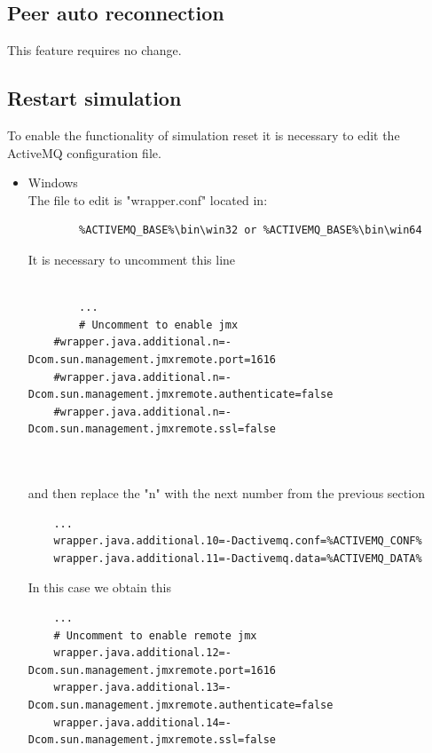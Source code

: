 \documentclass{article}
\begin{document}
\subsection{ Peer auto reconnection}
This feature requires no change.

\subsection{Restart simulation}

To enable the functionality of simulation reset it is necessary to edit the ActiveMQ configuration file.

\begin{itemize}
	\item Windows\\ 
The file to edit is "wrapper.conf" located in:

\lstset{language=Java}
\begin{lstlisting}	
		%ACTIVEMQ_BASE%\bin\win32 or %ACTIVEMQ_BASE%\bin\win64
\end{lstlisting}
It is necessary to uncomment this line

\begin{lstlisting}
  	
    	...
    	# Uncomment to enable jmx
	#wrapper.java.additional.n=-Dcom.sun.management.jmxremote.port=1616
	#wrapper.java.additional.n=-Dcom.sun.management.jmxremote.authenticate=false
	#wrapper.java.additional.n=-Dcom.sun.management.jmxremote.ssl=false

 
\end{lstlisting}

and then replace the "n" with the next number from the previous section

\begin{lstlisting}
	...
	wrapper.java.additional.10=-Dactivemq.conf=%ACTIVEMQ_CONF%
	wrapper.java.additional.11=-Dactivemq.data=%ACTIVEMQ_DATA%
\end{lstlisting}
In this case we obtain this
\begin{lstlisting}
	...
	# Uncomment to enable remote jmx
	wrapper.java.additional.12=-Dcom.sun.management.jmxremote.port=1616
	wrapper.java.additional.13=-Dcom.sun.management.jmxremote.authenticate=false
	wrapper.java.additional.14=-Dcom.sun.management.jmxremote.ssl=false
\end{lstlisting}


\end{itemize}
\end{document}
